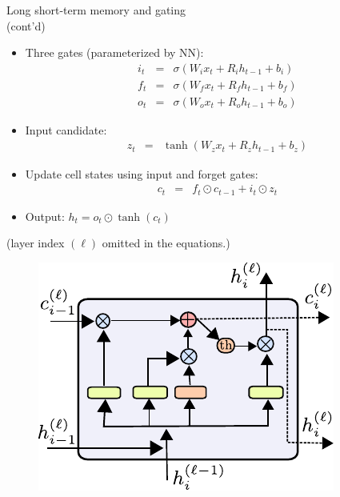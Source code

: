 \begin{frame}{Long short-term memory and gating\\ (cont'd)}
\begin{minipage}{0.6\linewidth}
\vsp
\begin{itemize}
\item Three gates (parameterized by NN):
\vspace{-3mm}
    \begin{eqnarray*} 
    i_{t} &=& \sigma(W_{i} x_{t} + R_{i} h_{t-1} + b_i) \\
    f_{t} &=& \sigma(W_{f} x_{t} + R_{f} h_{t-1} + b_f) \\
    o_t &=& \sigma(W_{o} x_{t} + R_{o} h_{t-1} + b_o) 
    \end{eqnarray*}
\item Input candidate:
\vspace{-3mm}
    \begin{eqnarray*} 
    z_t &=&  \tanh(W_{z} x_{t} + R_{z} h_{t-1} + b_z) 
    \end{eqnarray*}
\item Update cell states using input and forget gates:
\vspace{-3mm}
    \begin{eqnarray*} 
    c_{t} &=&  f_{t} \odot c_{t-1} + i_{t} \odot  z_t 
    \end{eqnarray*}
\item Output: $h_t = o_{t} \odot \tanh(c_t)$
\end{itemize}
\vsp
(layer index $(\ell)$ omitted in the equations.)
\end{minipage}
\begin{minipage}{0.39\linewidth}
\begin{figure}
                        \centering
                        \includegraphics[width=.9\linewidth]{./figures/lstm.pdf}
\end{figure}
\end{minipage}
\end{frame}

